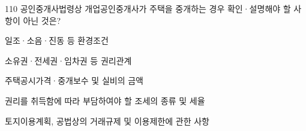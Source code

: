 \begin{question}{110}
공인중개사법령상 개업공인중개사가 주택을 중개하는 경우 확인·설명해야 할 사항이 아닌 것은?
\begin{choices}
  \item 일조·소음·진동 등 환경조건
  \item 소유권·전세권·임차권 등 권리관계
  \item 주택공시가격·중개보수 및 실비의 금액
  \item 권리를 취득함에 따라 부담하여야 할 조세의 종류 및 세율
  \item 토지이용계획, 공법상의 거래규제 및 이용제한에 관한 사항
\end{choices}
\end{question}
\answerall
{}
